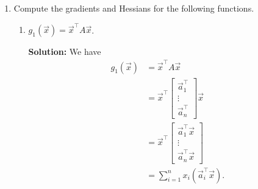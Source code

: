 \documentclass[10pt]{article}
\theoremstyle{definition}
\theoremstyle{plain}
\begin{document}
\begin{enumerate}[label=(\alph*)]
\begin{enumerate}[label=\roman*.]
    But one can also write the Jacobian as
    \begin{align}
    D\vec{g}(\vec{x}) &= \vec{x}[A^\top \nabla f(A\vec{x} + \vec{b})]^\top + f(A\vec{x} + \vec{b})I \\
    &= \vec{x}[\nabla f(A\vec{x} + \vec{b})]^\top A + f(A\vec{x} + \vec{b})I.
    \end{align}
\end{enumerate}

\item Compute the gradients and Hessians for the following functions.
\begin{enumerate}[label=\roman*.]
    \item $g_1(\vec{x}) = \vec{x}^\top A \vec{x}$.

    \textbf{Solution:} We have
    \begin{align}
    g_1(\vec{x}) &= \vec{x}^\top A \vec{x} \\
    &= \vec{x}^\top \begin{bmatrix} \vec{a}_1^\top \\ \vdots \\ \vec{a}_n^\top \end{bmatrix} \vec{x} \\
    &= \vec{x}^\top \begin{bmatrix} \vec{a}_1^\top \vec{x} \\ \vdots \\ \vec{a}_n^\top \vec{x} \end{bmatrix} \\
    &= \sum_{i=1}^n x_i (\vec{a}_i^\top \vec{x}).
    \end{align}


\end{enumerate}
\end{enumerate}
\end{document}
